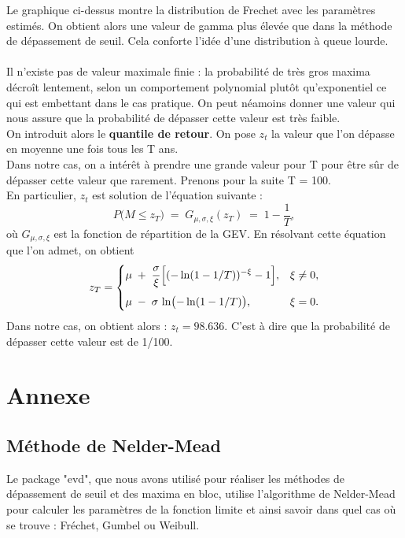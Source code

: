 \documentclass{article}
\begin{document}
Le graphique ci-dessus montre la distribution de Frechet avec les paramètres estimés.
On obtient alors une valeur de gamma plus élevée que dans la méthode de dépassement de seuil. Cela conforte l'idée d'une distribution à queue lourde.
\\
\\
Il n’existe pas de valeur maximale finie : la probabilité de très gros maxima décroît lentement, selon un comportement polynomial plutôt qu’exponentiel ce qui est embettant dans le cas pratique.
On peut néamoins donner une valeur qui nous assure que la probabilité de dépasser cette valeur est très faible.
\\
On introduit alors le \textbf{quantile de retour}. On pose $z_t$ la valeur que l’on dépasse en moyenne une fois tous les T ans.
\\
Dans notre cas, on a intérêt à prendre une grande valeur pour T pour être sûr de dépasser cette valeur que rarement. Prenons pour la suite T = 100.
\\
En particulier, $z_t$ est solution de l'équation suivante :
\[
P\bigl(M \le z_T\bigr)
\;=\;
G_{\mu,\sigma,\xi}(z_T)
\;=\;
1 - \frac{1}{T},
\]
où \(G_{\mu,\sigma,\xi}\) est la fonction de répartition de la GEV. En résolvant cette équation que l'on admet, on obtient
\[
z_T =
\begin{cases}
\displaystyle
\mu \;+\;\frac{\sigma}{\xi}\Bigl[(-\ln(1 - 1/T))^{-\xi} - 1\Bigr],
&\xi \neq 0,\\[1em]
\displaystyle
\mu \;-\;\sigma\,\ln\bigl(-\ln(1 - 1/T)\bigr),
&\xi = 0.
\end{cases}
\]
Dans notre cas, on obtient alors : $z_t = 98.636$. C'est à dire que la probabilité de dépasser cette valeur est de 1/100.




\newpage
\section{Annexe}

\subsection{Méthode de Nelder-Mead}

\noindent Le package "evd", que nous avons utilisé pour réaliser les méthodes de dépassement de seuil et des maxima en bloc, utilise l'algorithme de Nelder-Mead pour calculer les paramètres de la fonction limite et ainsi savoir dans quel cas où se trouve : Fréchet, Gumbel ou Weibull. \\
\end{document}
